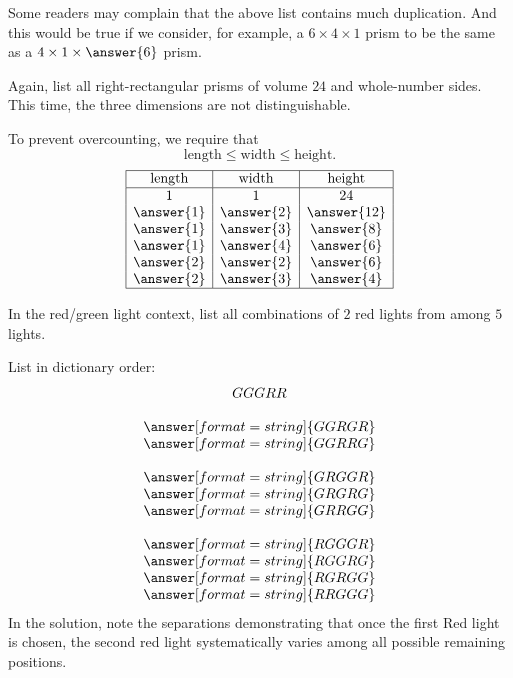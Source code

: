 \documentclass[nooutcomes]{ximera}
\begin{document}
\newpage
\begin{problem}
Some readers may complain that the above list contains much duplication.  And this would be true if we consider, for example, a $6\times4\times1$ prism to be the same as a $4\times1\times\answer{6}$ prism.  

Again, list all right-rectangular prisms of volume $24$ and whole-number sides.  This time, the three dimensions are not distinguishable. 

\begin{solution}
To prevent overcounting, we require that 
\[
\text{length} \le \text{width} \le \text{height}. 
\]
\[
\begin{array}{|c|c|c|}
\hline
\text{length} & \text{width} & \text{height} \\ 
\hline
1 & 1 & 24 \\
\answer{1} & \answer{2} & \answer{12} \\
\answer{1} & \answer{3} & \answer{8} \\
\answer{1} & \answer{4} & \answer{6} \\
\answer{2} & \answer{2} & \answer{6} \\
\answer{2} & \answer{3} & \answer{4} \\
\hline
\end{array}
\]
\end{solution}
\end{problem}


\newpage
\begin{problem}
In the red/green light context, list all combinations of $2$ red lights from among $5$ lights.    
\begin{solution}
List in dictionary order: 
\[
\begin{array}{c}
GGGRR \\ \\
\answer[format=string]{GGRGR} \\
\answer[format=string]{GGRRG} \\ \\
\answer[format=string]{GRGGR} \\
\answer[format=string]{GRGRG} \\
\answer[format=string]{GRRGG} \\ \\
\answer[format=string]{RGGGR} \\
\answer[format=string]{RGGRG} \\
\answer[format=string]{RGRGG} \\
\answer[format=string]{RRGGG}
\end{array}
\]
In the solution, note the separations demonstrating that once the first Red light is chosen, the second red light systematically varies among all possible remaining positions.  
\end{solution}
\end{problem}
\end{document}
